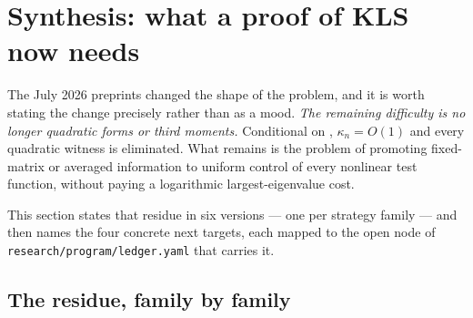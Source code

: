 \documentclass[../../main.tex]{subfiles}
\begin{document}
\section{Synthesis: what a proof of KLS now needs}
\label{sec:kls-synthesis}

The July 2026 preprints changed the shape of the problem, and it is worth stating the change
precisely rather than as a mood. \emph{The remaining difficulty is no longer quadratic forms or
third moments.} Conditional on \cite{Letwin2026QuadraticKLS}, $\kappa_n=O(1)$ and every quadratic
witness is eliminated. What remains is the problem of promoting fixed-matrix or averaged
information to uniform control of every nonlinear test function, without paying a logarithmic
largest-eigenvalue cost.

This section states that residue in six versions --- one per strategy family --- and then names the
four concrete next targets, each mapped to the open node of \texttt{research/program/ledger.yaml} that
carries it.

\subsection{The residue, family by family}
\label{subsec:synthesis-table}
\end{document}
